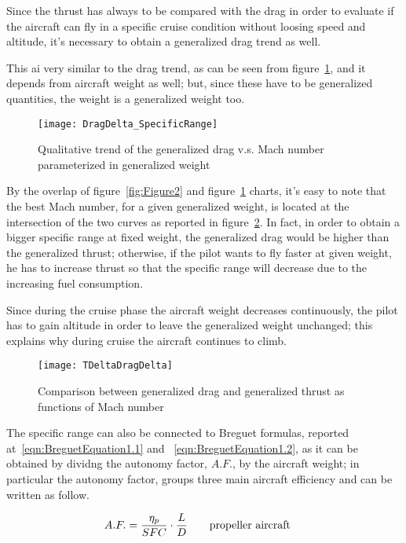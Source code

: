 \bigskip
\noindent
Since the thrust has always to be compared with the drag in order to evaluate if the aircraft can fly in a specific cruise condition without loosing speed and altitude, it's necessary to obtain a generalized drag trend as well. 

This ai very similar to the drag trend, as can be seen from figure~\ref{fig:Figure3}, and it depends from aircraft weight as well; but, since these have to be generalized quantities, the weight is a generalized weight too.

\begin{figure}[b]
\centering
\texttt{[image: DragDelta\_SpecificRange]}
\caption{Qualitative trend of the generalized drag v.s. Mach number parameterized in generalized weight}
\label{fig:Figure3}
\end{figure}

\bigskip
\noindent
By the overlap of figure~\ref{fig:Figure2} and figure~\ref{fig:Figure3} charts, it's easy to note that the best Mach number, for a given generalized weight, is located at the intersection of the two curves as reported in figure~\ref{fig:Figure4}. In fact, in order to obtain a bigger specific range at fixed weight, the generalized drag would be higher than the generalized thrust; otherwise, if the pilot wants to fly faster at given weight, he has to increase thrust so that the specific range will decrease due to the increasing fuel consumption.

Since during the cruise phase the aircraft weight decreases continuously, the pilot has to gain altitude in order to leave the generalized weight unchanged; this explains why during cruise the aircraft continues to climb. 

\begin{figure}[t]
\centering
\texttt{[image: TDeltaDragDelta]}
\caption{Comparison between generalized drag and generalized thrust as functions of Mach number}
\label{fig:Figure4}
\end{figure}

\bigskip
\noindent
The specific range can also be connected to Breguet formulas, reported at~\ref{eqn:BreguetEquation1.1} and ~\ref{eqn:BreguetEquation1.2}, as it can be obtained by dividng the autonomy factor, $A.F.$, by the aircraft weight; in particular the autonomy factor, groups three main aircraft efficiency and can be written as follow.

\begin{eqnarray}
A.F.=\frac{\eta_{p}}{SFC}\cdot\frac{L}{D} %
\qquad \textrm {\parbox[t][][t]{.25\linewidth} {propeller aircraft}}
\label{eqn:A.F.Equation4}
\end{eqnarray}

